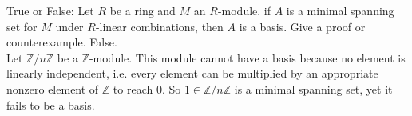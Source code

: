 \documentclass[avery5371,grid]{flashcards}
\newcommand{\Z}{\mathbb{Z}}
\begin{document}
% 
% 
% 
% 
% 
% 








\begin{flashcard}[Modules]{True or False: Let $R$ be a ring and $M$ an $R$-module. if $A$ is a minimal spanning set for $M$ under $R$-linear combinations, then $A$ is a basis. Give a proof or counterexample.}
 False. \\
 
 Let $\Z/n\Z$ be a $\Z$-module. This module cannot have a basis because no element is linearly independent, i.e. every element can be multiplied by an appropriate nonzero element of $\Z$ to reach 0. So $1 \in \Z/n\Z$ is a minimal spanning set, yet it fails to be a basis.
\end{flashcard}
\end{document}
